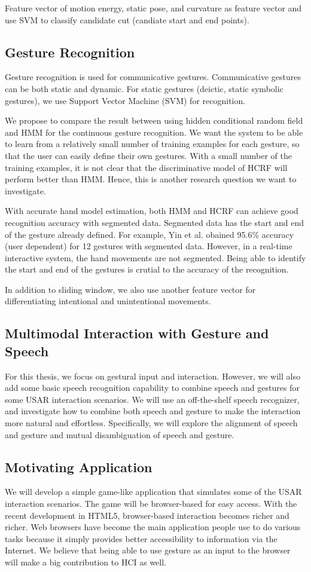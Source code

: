 Feature vector of motion energy, static pose, and curvature as feature vector
and use SVM to classify candidate cut (candiate start and end points). 


\subsection{Gesture Recognition}
Gesture recognition is used for communicative
gestures. Communicative gestures can be both static and dynamic. For static 
gestures (deictic, static symbolic gestures), we use Support Vector Machine
(SVM) for recognition. 

We propose to compare the result between using hidden conditional random field
and HMM for the continuous gesture recognition. We want the system to be able to
learn from a relatively small number of training examples for each gesture, so
that the user can easily define their own gestures. With a small number of the
training examples, it is not clear that the discriminative model of HCRF will
perform better than HMM. Hence, this is another research question we want to
investigate.

With accurate hand model estimation, both HMM and HCRF can achieve good
recognition accuracy with segmented data. Segmented data has the start and end
of the gesture already defined. For example, Yin et al. obained 95.6\% accuracy
(user dependent) for 12 gestures with segmented data. However, in a real-time
interactive system, the hand movements are not segmented. Being able to identify
the start and end of the gestures is crutial to the accuracy of the recognition.

In addition to sliding window, we also use another feature vector for
differentiating intentional and unintentional movements.

\subsection{Multimodal Interaction with Gesture and Speech} 
For this thesis, we focus on gestural input and interaction. However, we will
also add some basic speech recognition capability to combine speech and gestures
for some USAR interaction scenarios. We will use an off-the-shelf speech 
recognizer, and investigate how to combine both speech and gesture to make
the interaction more natural and effortless. Specifically, we will explore the
alignment of speech and gesture and mutual disambiguation of speech and gesture. 

\subsection{Motivating Application}
We will develop a simple game-like application that simulates some of the USAR
interaction scenarios. The game will be browser-based for easy access. With the
recent development in HTML5, browser-based interaction becomes richer and
richer. Web browsers have become the main application people use to do various
tasks because it simply provides better accessibility to information via the
Internet. We believe that being able to use gesture as an input to the browser
will make a big contribution to HCI as well.

